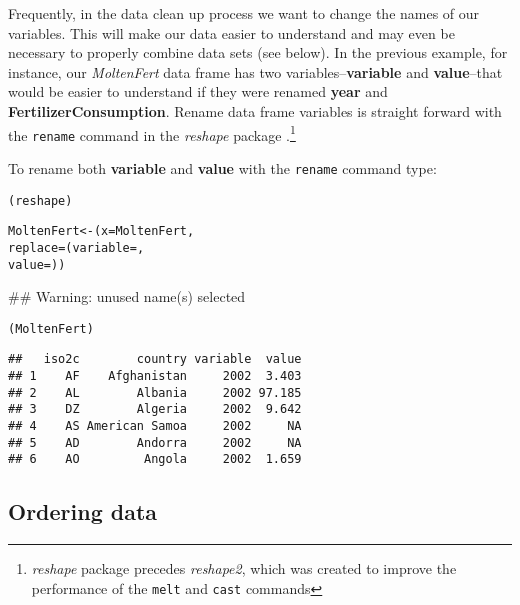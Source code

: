 Frequently, in the data clean up process we want to change the names of our variables. This will make our data easier to understand and may even be necessary to properly combine data sets (see below). In the previous example, for instance, our \emph{MoltenFert} data frame has two variables--\textbf{variable} and \textbf{value}--that would be easier to understand if they were renamed \textbf{year} and \textbf{FertilizerConsumption}. Rename data frame variables is straight forward with the \texttt{rename} command in the \emph{reshape} package \citep{R-reshape}.\footnote{\emph{reshape} package precedes \emph{reshape2}, which was created to improve the performance of the \texttt{melt} and \texttt{cast} commands}

To rename both \textbf{variable} and \textbf{value} with the \texttt{rename} command type:

\begin{knitrout}
\color{fgcolor}\begin{kframe}
\begin{alltt}
(reshape)

MoltenFert <- (x = MoltenFert,
                     replace = (variable = ,
                                 value = ))
\end{alltt}


{\ttfamily\noindent\textcolor{warningcolor}{\#\# Warning: unused name(s) selected}}\begin{alltt}

(MoltenFert)
\end{alltt}
\begin{verbatim}
##   iso2c        country variable  value
## 1    AF    Afghanistan     2002  3.403
## 2    AL        Albania     2002 97.185
## 3    DZ        Algeria     2002  9.642
## 4    AS American Samoa     2002     NA
## 5    AD        Andorra     2002     NA
## 6    AO         Angola     2002  1.659
\end{verbatim}
\end{kframe}
\end{knitrout}


\subsection{Ordering data}

